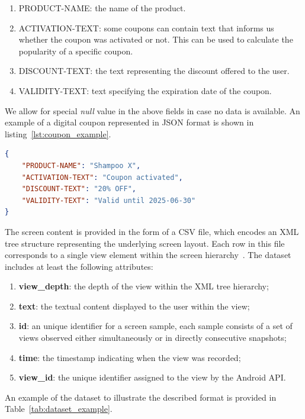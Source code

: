 \documentclass[licencjacka,en]{pracamgr}
\begin{document}
\begin{enumerate}
    \item PRODUCT-NAME: the name of the product.
       \item ACTIVATION-TEXT: some coupons can contain text that informs us whether the coupon was activated or not.
        This can be used to calculate the popularity of a specific coupon.
    \item DISCOUNT-TEXT: the text representing the discount offered to the user.
    \item VALIDITY-TEXT: text specifying the expiration date of the coupon.
\end{enumerate}
We allow for special \textit{null} value in the above fields in case no data is available. An example of a digital coupon represented in JSON format is shown in listing~\ref{lst:coupon_example}.

\begin{lstlisting}[language=json, caption={Example of a digital coupon in JSON format.}, label={lst:coupon_example}]
{
    "PRODUCT-NAME": "Shampoo X",
    "ACTIVATION-TEXT": "Coupon activated",
    "DISCOUNT-TEXT": "20% OFF",
    "VALIDITY-TEXT": "Valid until 2025-06-30"
}
\end{lstlisting}

The screen content is provided in the form of a CSV file, which encodes an XML tree structure representing the underlying screen layout. Each row in this file corresponds to a single view element within the screen hierarchy~\cite{android_view}. The dataset includes at least the following attributes:

\begin{enumerate}
    \item \textbf{view\_depth}: the depth of the view within the XML tree hierarchy;
    \item \textbf{text}: the textual content displayed to the user within the view;
    \item \textbf{id}: an unique identifier for a screen sample, each sample consists of a set of views observed either simultaneously or in directly consecutive snapshots;
    \item \textbf{time}: the timestamp indicating when the view was recorded;
    \item \textbf{view\_id}: the unique identifier assigned to the view by the Android API.
\end{enumerate}

An example of the dataset to illustrate the described format is provided in Table~\ref{tab:dataset_example}.
\end{document}
